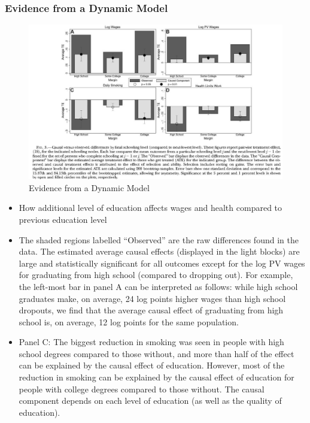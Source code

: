 \subsubsection{Evidence from a Dynamic Model}  
\begin{figure}[H]%
                \centering
                \includegraphics[width=5in]{images/ch3/48.png}
                \caption {Evidence from a Dynamic Model}
                \label{fig:label}
            \end{figure}
\begin{itemize}
    \item How additional level of education affects wages and health compared to previous education level
    \item The shaded regions labelled “Observed” are the raw differences found in the data. The estimated average causal effects (displayed in the light blocks) are large and statistically significant for all outcomes except for the log PV wages for graduating from high school (compared to dropping out). For example, the left-most bar in panel A can be interpreted as follows: while high school graduates make, on average, 24 log points higher wages than high school dropouts, we find that the average causal effect of graduating from high school is, on average, 12 log points for the same population.
    \item Panel C: The biggest reduction in smoking was seen in people with high school degrees compared to those without, and more than half of the effect can be explained by the causal effect of education. However, most of the reduction in smoking can be explained by the causal effect of education for people with college degrees compared to those without. The causal component depends on each level of education (as well as the quality of education).
\end{itemize}

